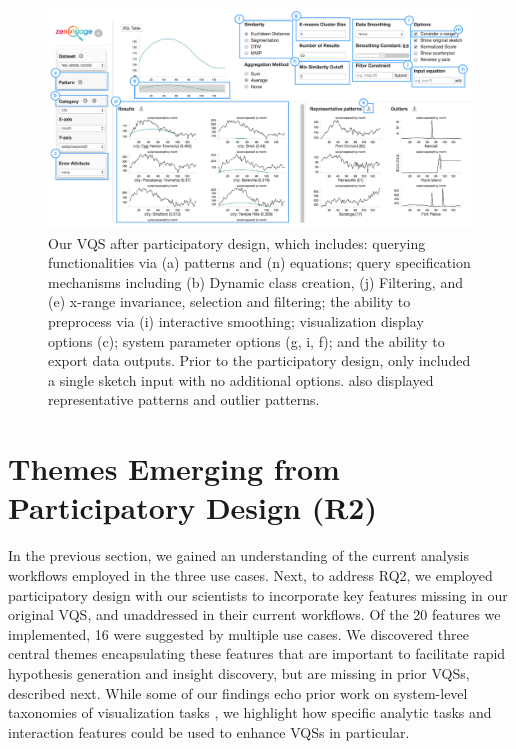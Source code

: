 \begin{figure}[ht!]
\centering
\vspace{-15pt}
\includegraphics[width=\linewidth]{figures/newZV.pdf} %
\vspace{-5pt}\caption{Our VQS after participatory design, which includes: querying functionalities via (a) patterns and (n) equations; query specification mechanisms including  (b) Dynamic class creation, (j) Filtering, and  (e) x-range invariance, selection and filtering; the ability to preprocess via (i) interactive smoothing; visualization display options (c); system parameter options (g, i, f); and the ability to export data outputs. Prior to the participatory design, \zv only included a single sketch input with no additional options. \zv also displayed representative patterns and outlier patterns.}
\label{zvOverview}
\vspace{-14pt}
\end{figure}

\section{Themes Emerging from Participatory Design (R2)}\label{findings}
\par In the previous section, we gained an understanding of the current analysis workflows employed in the three use cases. Next, to address RQ2, we employed participatory design with our scientists to incorporate key features  missing in our original VQS, and unaddressed in their
current workflows.  Of the 20 features we implemented, 16 were suggested by multiple use cases. We discovered three central themes
encapsulating these features that are important to facilitate rapid
hypothesis generation and insight discovery, but are missing in prior VQSs,  described next. 
While some of our findings echo prior work on system-level taxonomies of visualization tasks \cite{Amar2005,Heer2012}, we highlight how specific analytic tasks and interaction features could be used to enhance VQSs in particular. 
